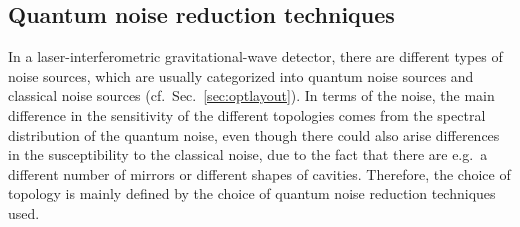 \FloatBarrier
\subsection{Quantum noise reduction techniques}\label{sec:qnr}

In a laser-interferometric
gravitational-wave detector, there are different types of noise
sources, which are usually categorized into quantum noise sources
and classical noise sources (cf.\
Sec.~\ref{sec:optlayout}). In terms of the noise, the main
difference in the sensitivity of the different topologies comes
from the spectral distribution of the quantum noise, even though there
could also arise differences in the susceptibility to the
classical noise, due to the fact that there are e.g.\ a different
number of mirrors or different shapes of cavities. Therefore, the choice
of topology is mainly defined by the choice of quantum noise reduction
techniques used.

